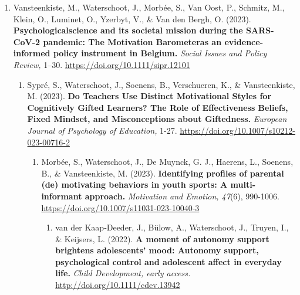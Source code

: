 \documentclass[
  twocolumn]{article}
\providecommand{\tightlist}{%
  \setlength{\itemsep}{0pt}\setlength{\parskip}{0pt}}
\begin{document}
\begin{enumerate}
\begin{enumerate}
\begin{enumerate}
\begin{enumerate}
        \begin{enumerate}
        \def\labelenumv{\arabic{enumv}.}
        \tightlist
        \item
          Vansteenkiste, M., Waterschoot, J., Morbée, S., Van Oost, P.,
          Schmitz, M., Klein, O., Luminet, O., Yzerbyt, V., \& Van den
          Bergh, O. (2023). \textbf{Psychologicalscience and its
          societal mission during the SARS-CoV-2 pandemic: The
          Motivation Barometeras an evidence-informed policy instrument
          in Belgium.} \emph{Social Issues and Policy Review,} 1--30.
          \url{https://doi.org/10.1111/sipr.12101}

          \begin{enumerate}
          \def\labelenumvi{\arabic{enumvi}.}
          \tightlist
          \item
            Sypré, S., Waterschoot, J., Soenens, B., Verschueren, K., \&
            Vansteenkiste, M. (2023). \textbf{Do Teachers Use Distinct
            Motivational Styles for Cognitively Gifted Learners? The
            Role of Effectiveness Beliefs, Fixed Mindset, and
            Misconceptions about Giftedness.} \emph{European Journal of
            Psychology of Education,} 1-27.
            \url{https://doi.org/10.1007/s10212-023-00716-2}

            \begin{enumerate}
            \def\labelenumvii{\arabic{enumvii}.}
            \tightlist
            \item
              Morbée, S., Waterschoot, J., De Muynck, G. J., Haerens,
              L., Soenens, B., \& Vansteenkiste, M. (2023).
              \textbf{Identifying profiles of parental (de) motivating
              behaviors in youth sports: A multi-informant approach.}
              \emph{Motivation and Emotion, 47}(6), 990-1006.
              \url{https://doi.org/10.1007/s11031-023-10040-3}

              \begin{enumerate}
              \def\labelenumviii{\arabic{enumviii}.}
              \tightlist
              \item
                van der Kaap‐Deeder, J., Bülow, A., Waterschoot, J.,
                Truyen, I., \& Keijsers, L. (2022). \textbf{A moment of
                autonomy support brightens adolescents' mood: Autonomy
                support, psychological control and adolescent affect in
                everyday life.} \emph{Child Development, early access.}
                \url{http://doi.org/10.1111/cdev.13942}


\end{enumerate}
\end{enumerate}
\end{enumerate}
\end{enumerate}
\end{enumerate}
\end{enumerate}
\end{enumerate}
\end{enumerate}
\end{document}
